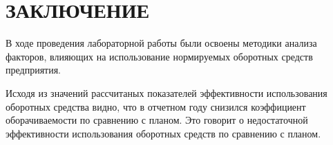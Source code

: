\section*{ЗАКЛЮЧЕНИЕ}

В ходе проведения лабораторной работы были освоены методики анализа факторов,
влияющих на использование нормируемых оборотных средств предприятия.

Исходя из значений рассчитаных показателей эффективности использования 
оборотных средства видно, что в отчетном году снизился коэффициент оборачиваемости
по сравнению с планом. Это говорит о недостаточной эффективности
использования оборотных средств по сравнению с планом.

\newpage

